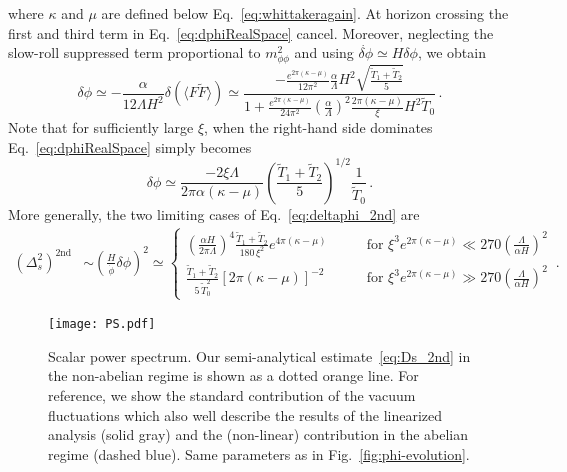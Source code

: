 where $\kappa$ and $\mu$ are defined below Eq.~\eqref{eq:whittakeragain}. At horizon crossing the first and third term in Eq.~\eqref{eq:dphiRealSpace} cancel. Moreover, neglecting the slow-roll suppressed term proportional to $m_{\phi \phi}^2$ and using $\dot{\delta \phi} \simeq H \delta \phi$, we obtain
\begin{equation}
 \delta \phi \simeq - \frac{\alpha}{12 \Lambda H^2} \delta(\langle F \tilde F \rangle) \simeq \frac{- \frac{e^{2 \pi(\kappa - \mu)}}{{12} \pi^2} \frac{\alpha}{\Lambda} H^2 \sqrt{\frac{\tilde T_1 + \tilde T_2}{5}}}{1 + \frac{e^{2 \pi(\kappa - \mu)}}{24 \pi^2} \left(\frac{\alpha}{\Lambda} \right)^2  \frac{2 \pi (\kappa - \mu )}{\xi} H^2 \tilde T_0} \,.
 \label{eq:deltaphi_2nd}
\end{equation}
Note that for sufficiently large $\xi$, when the right-hand side dominates Eq.~\eqref{eq:dphiRealSpace} simply becomes
\begin{equation}
 \delta \phi \simeq \frac{-2 \xi \Lambda}{ 2 \pi \alpha (\kappa - \mu )} \left( \frac{\tilde T_1 + \tilde T_2}{5} \right)^{1/2} \frac{1}{\tilde T_0 } \,.
\end{equation}
More generally, the two limiting cases of Eq.~\eqref{eq:deltaphi_2nd} are
\begin{align}
 \left(\Delta_s^2\right)^\text{2nd} & \sim \left( \frac{H}{\dot \phi} \delta \phi \right)^2   \simeq \begin{cases}
    \left( \frac{\alpha H}{2 \pi \Lambda} \right)^4  \frac{\tilde T_1 + \tilde T_2}{180 \, \xi^2}  e^{4 \pi(\kappa - \mu)}
     &\qquad  \text{for     } \xi^3 e^{2 \pi(\kappa - \mu)} \ll 270  \left( \frac{\Lambda}{\alpha H}\right)^2    \label{eq:Ds_2nd} \\
  \frac{\tilde T_1 + \tilde T_2}{5 \, \tilde T_0^2}   \left[2 \pi (\kappa - \mu )\right]^{-2}   &\qquad \text{for    } \xi^3 e^{2 \pi(\kappa - \mu)} \gg 270  \left( \frac{\Lambda}{\alpha H}\right)^2  
   \end{cases} \,.
\end{align}

\begin{figure}
\centering
\texttt{[image: PS.pdf]}
\caption{Scalar power spectrum. Our semi-analytical estimate~\eqref{eq:Ds_2nd}  in the non-abelian regime is shown as a dotted orange line. For reference, we show the standard contribution of the vacuum fluctuations which also well describe the results of the linearized analysis (solid gray) and the (non-linear) contribution in the abelian regime (dashed blue). Same parameters as in Fig.~\ref{fig:phi-evolution}.}
 \label{fig:spectraPS}
\end{figure}


